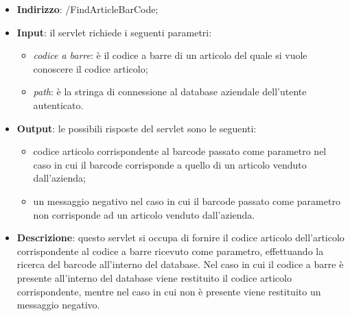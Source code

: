 \begin{itemize}
	\item \textbf{Indirizzo}: /FindArticleBarCode;
	\item \textbf{Input}: il servlet richiede i seguenti parametri:
		\begin{itemize}
			\item \textit{codice a barre}: è il codice a barre di un articolo del quale si vuole conoscere il codice articolo;
			\item \textit{path}: è la stringa di connessione al database aziendale dell'utente autenticato.
		\end{itemize}
	\item \textbf{Output}: le possibili risposte del servlet sono le seguenti:
		\begin{itemize}
			\item codice articolo corrispondente al barcode passato come parametro nel caso in cui il barcode corrisponde a quello di un articolo venduto dall'azienda;
			\item un messaggio negativo nel caso in cui il barcode passato come parametro non corrisponde ad un articolo venduto dall'azienda.
		\end{itemize}
	\item \textbf{Descrizione}: questo servlet si occupa di fornire il codice articolo dell'articolo corrispondente al codice a barre ricevuto come parametro, effettuando la ricerca del barcode all'interno del database. Nel caso in cui il codice a barre è presente all'interno del database viene restituito il codice articolo corrispondente, mentre nel caso in cui non è presente viene restituito un messaggio negativo.
\end{itemize}


